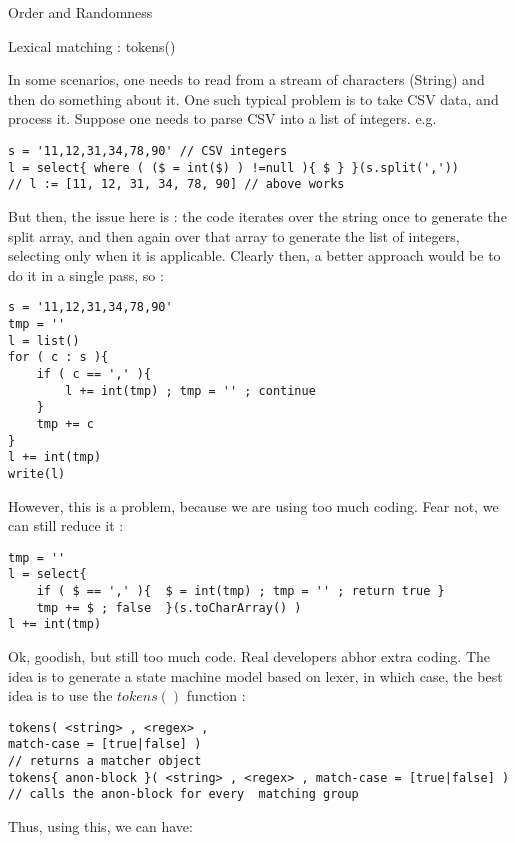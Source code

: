 \begin{section}{Order and Randomness}

\begin{subsection}{Lexical matching : tokens()}

In some scenarios, one needs to read from a stream of characters (String) and then do something about it.
One such typical problem is to take CSV data, and process it. Suppose one needs to parse CSV into a list of integers. e.g.

\begin{lstlisting}[style=JexlStyle]
s = '11,12,31,34,78,90' // CSV integers 
l = select{ where ( ($ = int($) ) !=null ){ $ } }(s.split(','))
// l := [11, 12, 31, 34, 78, 90] // above works
\end{lstlisting}  
But then, the issue here is : the code iterates over the string once to generate the split array, 
and then again over that array to generate the list of integers, selecting only when it is applicable.
Clearly then, a better approach would be to do it in a single pass, so :

\begin{lstlisting}[style=JexlStyle]
s = '11,12,31,34,78,90'
tmp = ''
l = list()
for ( c : s ){
    if ( c == ',' ){
        l += int(tmp) ; tmp = '' ; continue 
    }
    tmp += c
}
l += int(tmp) 
write(l)
\end{lstlisting}  
 
However, this is a problem, because we are using too much coding. 
Fear not, we can still reduce it :

\begin{lstlisting}[style=JexlStyle]
tmp = ''
l = select{ 
    if ( $ == ',' ){  $ = int(tmp) ; tmp = '' ; return true } 
    tmp += $ ; false  }(s.toCharArray() )
l += int(tmp) 
\end{lstlisting}  
  
Ok, goodish, but still too much code. Real developers abhor extra coding. 
The idea is to generate a state machine model based on lexer, in which case, 
the best idea is to use the $tokens()$ function :  

\begin{lstlisting}[style=JexlStyle]
tokens( <string> , <regex> , 
match-case = [true|false] ) 
// returns a matcher object 
tokens{ anon-block }( <string> , <regex> , match-case = [true|false] ) 
// calls the anon-block for every  matching group  
\end{lstlisting}  
  
Thus, using this, we can have:  
  

\end{subsection}
\end{section}
